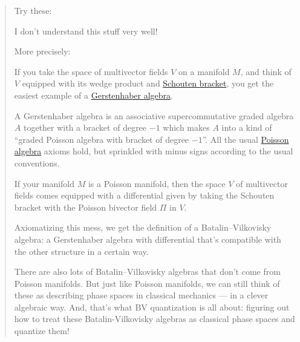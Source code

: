 \documentclass{article}
\renewcommand{\texttt}[1]{%
  \begingroup
  \ttfamily
  \begingroup\lccode`~=`/\lowercase{\endgroup\def~}{/\discretionary{}{}{}}%
  \begingroup\lccode`~=`[\lowercase{\endgroup\def~}{[\discretionary{}{}{}}%
  \begingroup\lccode`~=`.\lowercase{\endgroup\def~}{.\discretionary{}{}{}}%
  \catcode`/=\active\catcode`[=\active\catcode`.=\active
  \scantokens{#1\noexpand}%
  \endgroup
}
\begin{document}
\begin{quote}
Try these:


I don't understand this stuff very well!

More precisely:

If you take the space of multivector fields \(V\) on a manifold \(M\),
and think of \(V\) equipped with its wedge product and
\href{http://www.mimuw.edu.pl/~pwit/TOK/sem4/online/node9.html}{Schouten
bracket}, you get the easiest example of a
\href{http://golem.ph.utexas.edu/category/2007/02/infinitely_categorified_calcul.html}{Gerstenhaber
algebra}.

A Gerstenhaber algebra is an associative supercommutative graded algebra
\(A\) together with a bracket of degree \(-1\) which makes \(A\) into a
kind of ``graded Poisson algebra with bracket of degree \(-1\)''. All
the usual \href{http://en.wikipedia.org/wiki/Poisson_algebra}{Poisson
algebra} axioms hold, but sprinkled with minus signs according to the
usual conventions.

If your manifold \(M\) is a Poisson manifold, then the space \(V\) of
multivector fields comes equipped with a differential given by taking
the Schouten bracket with the Poisson bivector field \(\Pi\) in \(V\).

Axiomatizing this mess, we get the definition of a Batalin--Vilkovisky
algebra: a Gerstenhaber algebra with differential that's compatible with
the other structure in a certain way.

There are also lots of Batalin--Vilkovisky algebras that don't come from
Poisson manifolds. But just like Poisson manifolds, we can still think
of these as describing phase spaces in classical mechanics --- in a
clever algebraic way. And, that's what BV quantization is all about:
figuring out how to treat these Batalin-Vilkovisky algebras as classical
phase spaces and quantize them!


\end{quote}
\end{document}
